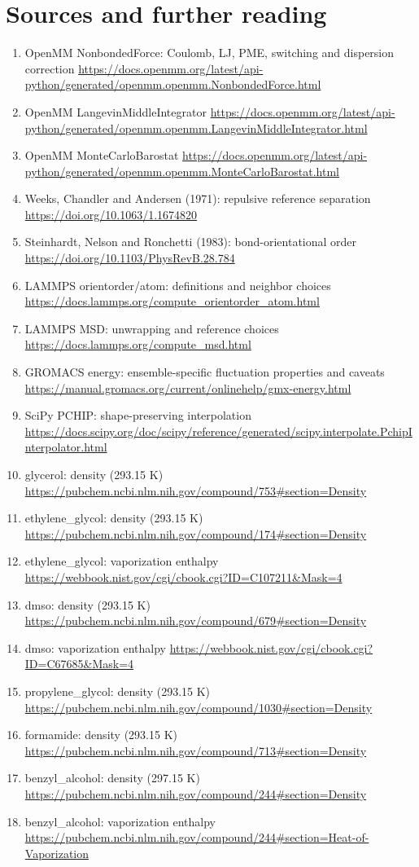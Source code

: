 \documentclass[11pt]{article}
\begin{document}
\section*{Sources and further reading}\begin{enumerate}
\item OpenMM NonbondedForce: Coulomb, LJ, PME, switching and dispersion correction \url{https://docs.openmm.org/latest/api-python/generated/openmm.openmm.NonbondedForce.html}
\item OpenMM LangevinMiddleIntegrator \url{https://docs.openmm.org/latest/api-python/generated/openmm.openmm.LangevinMiddleIntegrator.html}
\item OpenMM MonteCarloBarostat \url{https://docs.openmm.org/latest/api-python/generated/openmm.openmm.MonteCarloBarostat.html}
\item Weeks, Chandler and Andersen (1971): repulsive reference separation \url{https://doi.org/10.1063/1.1674820}
\item Steinhardt, Nelson and Ronchetti (1983): bond-orientational order \url{https://doi.org/10.1103/PhysRevB.28.784}
\item LAMMPS orientorder/atom: definitions and neighbor choices \url{https://docs.lammps.org/compute_orientorder_atom.html}
\item LAMMPS MSD: unwrapping and reference choices \url{https://docs.lammps.org/compute_msd.html}
\item GROMACS energy: ensemble-specific fluctuation properties and caveats \url{https://manual.gromacs.org/current/onlinehelp/gmx-energy.html}
\item SciPy PCHIP: shape-preserving interpolation \url{https://docs.scipy.org/doc/scipy/reference/generated/scipy.interpolate.PchipInterpolator.html}
\item glycerol: density (293.15 K) \url{https://pubchem.ncbi.nlm.nih.gov/compound/753#section=Density}
\item ethylene\_glycol: density (293.15 K) \url{https://pubchem.ncbi.nlm.nih.gov/compound/174#section=Density}
\item ethylene\_glycol: vaporization enthalpy \url{https://webbook.nist.gov/cgi/cbook.cgi?ID=C107211&Mask=4}
\item dmso: density (293.15 K) \url{https://pubchem.ncbi.nlm.nih.gov/compound/679#section=Density}
\item dmso: vaporization enthalpy \url{https://webbook.nist.gov/cgi/cbook.cgi?ID=C67685&Mask=4}
\item propylene\_glycol: density (293.15 K) \url{https://pubchem.ncbi.nlm.nih.gov/compound/1030#section=Density}
\item formamide: density (293.15 K) \url{https://pubchem.ncbi.nlm.nih.gov/compound/713#section=Density}
\item benzyl\_alcohol: density (297.15 K) \url{https://pubchem.ncbi.nlm.nih.gov/compound/244#section=Density}
\item benzyl\_alcohol: vaporization enthalpy \url{https://pubchem.ncbi.nlm.nih.gov/compound/244#section=Heat-of-Vaporization}
\end{enumerate}
\end{document}
